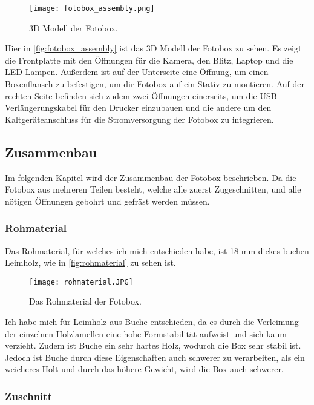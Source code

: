 \begin{figure}[H]
    \centering
    \texttt{[image: fotobox\_assembly.png]}
    \caption{3D Modell der Fotobox.}
    \label{fig:fotobox_assembly}
\end{figure}

Hier in \autoref{fig:fotobox_assembly} ist das 3D Modell der Fotobox zu sehen.
Es zeigt die Frontplatte mit den Öffnungen für die Kamera, den Blitz, Laptop
und die LED Lampen. Außerdem ist auf der Unterseite eine Öffnung, um 
einen Boxenflansch zu befestigen, um dir Fotobox auf ein Stativ zu montieren.
Auf der rechten Seite befinden sich zudem zwei Öffnungen einerseits, um die
USB Verlängerungskabel für den Drucker einzubauen und die andere um den Kaltgeräteanschluss
für die Stromversorgung der Fotobox zu integrieren.

\newpage

\subsection{Zusammenbau}

Im folgenden Kapitel wird der Zusammenbau der Fotobox beschrieben.
Da die Fotobox aus mehreren Teilen besteht, welche alle zuerst Zugeschnitten,
und alle nötigen Öffnungen gebohrt und gefräst werden müssen.

\subsubsection{Rohmaterial}

Das Rohmaterial, für welches ich mich entschieden habe, ist 18 mm dickes buchen
Leimholz, wie in \autoref{fig:rohmaterial} zu sehen ist.

\begin{figure}[H]
    \centering
    \texttt{[image: rohmaterial.JPG]}
    \caption{Das Rohmaterial der Fotobox.}
    \label{fig:rohmaterial}
\end{figure}

Ich habe mich für Leimholz aus Buche entschieden, da es durch die Verleimung der
einzelnen Holzlamellen eine hohe Formstabilität aufweist und sich kaum verzieht.
Zudem ist Buche ein sehr hartes Holz, wodurch die Box sehr stabil ist.
Jedoch ist Buche durch diese Eigenschaften auch schwerer zu verarbeiten,
als ein weicheres Holt und durch das höhere Gewicht, wird die Box auch schwerer.

\newpage

\subsubsection{Zuschnitt}

